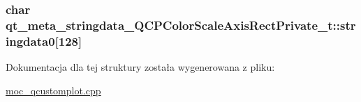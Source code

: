 \subsubsection[{\texorpdfstring{stringdata0}{stringdata0}}]{\setlength{\rightskip}{0pt plus 5cm}char qt\+\_\+meta\+\_\+stringdata\+\_\+\+Q\+C\+P\+Color\+Scale\+Axis\+Rect\+Private\+\_\+t\+::stringdata0\mbox{[}128\mbox{]}}\hypertarget{structqt__meta__stringdata___q_c_p_color_scale_axis_rect_private__t_ab4bf0dacc0cccfabffae8da79f9f5f46}{}\label{structqt__meta__stringdata___q_c_p_color_scale_axis_rect_private__t_ab4bf0dacc0cccfabffae8da79f9f5f46}


Dokumentacja dla tej struktury została wygenerowana z pliku\+:\begin{DoxyCompactItemize}
\item 
\hyperlink{moc__qcustomplot_8cpp}{moc\+\_\+qcustomplot.\+cpp}\end{DoxyCompactItemize}
